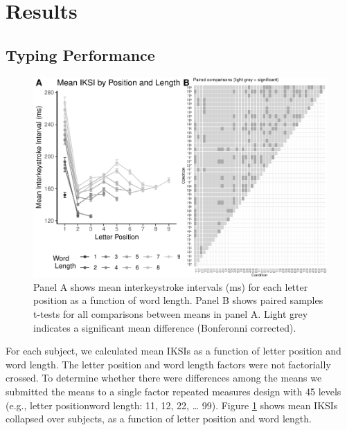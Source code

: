 \documentclass[,man,donotrepeattitle,floatsintext]{apa6}
\begin{document}
\hypertarget{results}{%
\section{Results}\label{results}}

\hypertarget{typing-performance}{%
\subsection{Typing Performance}\label{typing-performance}}



\begin{figure}
\centering
\includegraphics{Entropy_typing_draft_files/figure-latex/typing-mean-iksis-comparisons-1.pdf}
\caption{\label{fig:typing-mean-iksis-comparisons}Panel A shows mean interkeystroke intervals (ms) for each letter position as a function of word length. Panel B shows paired samples t-tests for all comparisons between means in panel A. Light grey indicates a significant mean difference (Bonferonni corrected).}
\end{figure}

For each subject, we calculated mean IKSIs as a function of letter position and word length. The letter position and word length factors were not factorially crossed. To determine whether there were differences among the means we submitted the means to a single factor repeated measures design with 45 levels (e.g., letter position\textbar{}word length: 1\textbar{}1, 1\textbar{}2, 2\textbar{}2, \ldots{} 9\textbar{}9). Figure \ref{fig:typing-mean-iksis-comparisons} shows mean IKSIs collapsed over subjects, as a function of letter position and word length.
\end{document}
